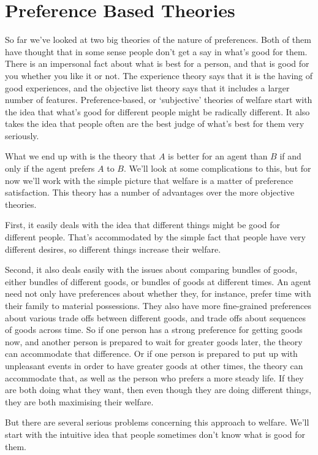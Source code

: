 \section{Preference Based Theories}
So far we've looked at two big theories of the nature of preferences. Both of them have thought that in some sense people don't get a say in what's good for them. There is an impersonal fact about what is best for a person, and that is good for you whether you like it or not. The experience theory says that it is the having of good experiences, and the objective list theory says that it includes a larger number of features. Preference-based, or `subjective' theories of welfare start with the idea that what's good for different people might be radically different. It also takes the idea that people often are the best judge of what's best for them very seriously.

What we end up with is the theory that $A$ is better for an agent than $B$ if and only if the agent prefers $A$ to $B$. We'll look at some complications to this, but for now we'll work with the simple picture that welfare is a matter of preference satisfaction. This theory has a number of advantages over the more objective theories.

First, it easily deals with the idea that different things might be good for different people. That's accommodated by the simple fact that people have very different desires, so different things increase their welfare.

Second, it also deals easily with the issues about comparing bundles of goods, either bundles of different goods, or bundles of goods at different times. An agent need not only have preferences about whether they, for instance, prefer time with their family to material possessions. They also have more fine-grained preferences about various trade offs between different goods, and trade offs about sequences of goods across time. So if one person has a strong preference for getting goods now, and another person is prepared to wait for greater goods later, the theory can accommodate that difference. Or if one person is prepared to put up with unpleasant events in order to have greater goods at other times, the theory can accommodate that, as well as the person who prefers a more steady life. If they are both doing what they want, then even though they are doing different things, they are both maximising their welfare.

But there are several serious problems concerning this approach to welfare. We'll start with the intuitive idea that people sometimes don't know what is good for them.

